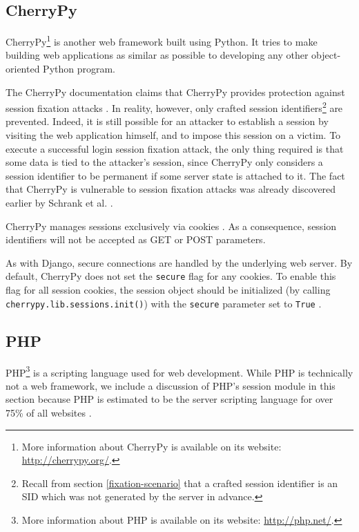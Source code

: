 \subsection{CherryPy}

CherryPy\footnote{More information about CherryPy is available on its website: \url{http://cherrypy.org/}.} is another web framework built using Python. It tries to make building web applications as similar as possible to developing any other object-oriented Python program.

The CherryPy documentation claims that CherryPy provides protection against session fixation attacks \cite{CherryPySessions}. In reality, however, only crafted session identifiers\footnote{Recall from section \ref{fixation-scenario} that a crafted session identifier is an SID which was not generated by the server in advance.} are prevented. Indeed, it is still possible for an attacker to establish a session by visiting the web application himself, and to impose this session on a victim. To execute a successful login session fixation attack, the only thing required is that some data is tied to the attacker's session, since CherryPy only considers a session identifier to be permanent if some server state is attached to it. The fact that CherryPy is vulnerable to session fixation attacks was already discovered earlier by Schrank et al. \cite{Schrank2010}.

CherryPy manages sessions exclusively via cookies \cite{CherryPySessions}. As a consequence, session identifiers will not be accepted as GET or POST parameters.

As with Django, secure connections are handled by the underlying web server. By default, CherryPy does not set the \texttt{secure} flag for any cookies. To enable this flag for all session cookies, the session object should be initialized (by calling \texttt{cherrypy.lib.sessions.init()}) with the \texttt{secure} parameter set to \texttt{True} \cite{CherryPySessions}.

\subsection{PHP}

PHP\footnote{More information about PHP is available on its website: \url{http://php.net/}.} is a scripting language used for web development. While PHP is technically not a web framework, we include a discussion of PHP's session module in this section because PHP is estimated to be the server scripting language for over 75\% of all websites \cite{ServerSurvey}.

